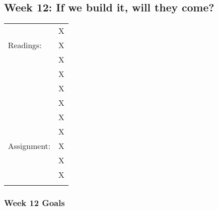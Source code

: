 \documentclass[]{article}
\begin{document}
\subsection{Week 12: If we build it, will they
come?}\label{week-12-if-we-build-it-will-they-come}

\begin{longtable}[c]{@{}ll@{}}
\toprule\addlinespace
& X
\\\addlinespace
Readings: & X
\\\addlinespace
& X
\\\addlinespace
& X
\\\addlinespace
& X
\\\addlinespace
& X
\\\addlinespace
& X
\\\addlinespace
& X
\\\addlinespace
Assignment: & X
\\\addlinespace
& X
\\\addlinespace
& X
\\\addlinespace
\bottomrule
\end{longtable}

\subsubsection{Week 12 Goals}\label{week-12-goals}
\end{document}
